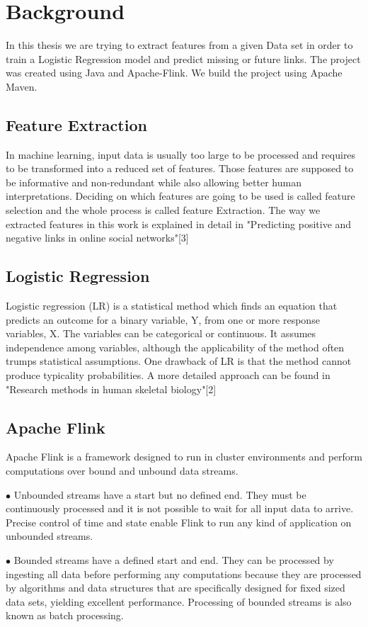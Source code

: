 
\chapter{Background}

In this thesis we are trying to extract features from a given Data set in order to train a Logistic Regression model and predict missing or future links.
The project was created using Java and Apache-Flink. We build the project using Apache Maven. 
 





\section{Feature Extraction}
In machine learning, input data is usually too large to be processed and requires to be transformed into a reduced set of features. Those features are supposed to be informative and non-redundant while also allowing better human interpretations. Deciding on which features are going to be used is called feature selection and the whole process is called feature Extraction. The way we extracted features in this work is explained in detail in "Predicting positive and negative links in online social networks"[3] 
\section{Logistic Regression}
Logistic regression (LR) is a statistical method which finds an equation that predicts an outcome for a binary variable, Y, from one or more response variables, X. The variables can be categorical or continuous. It assumes independence among variables, although the applicability of the method often trumps statistical assumptions. One drawback of LR is that the method cannot produce typicality probabilities. A more detailed approach can be found in "Research methods in human skeletal biology"[2]

\section{Apache Flink}

Apache Flink is a framework designed to run in cluster environments and perform computations over bound and unbound data streams. 
    \begin{description}
    \item $\bullet$ Unbounded streams have a start but no defined end. They must be continuously processed and it is not possible to wait for all input data to arrive.
    Precise control of time and state enable Flink to run any kind of application on unbounded streams. 

    \item $\bullet$ Bounded streams have a defined start and end. They can be processed by ingesting all data before performing any computations because they are processed by algorithms and data structures that are specifically designed for fixed sized data sets, yielding excellent performance.
    Processing of bounded streams is also known as batch processing.
    \end{description}
    
